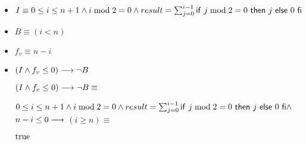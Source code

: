 \documentclass{article}
\begin{document}
\begin{itemize}
    \item $I \equiv 0 \leq i \leq n+1 \wedge i \bmod 2 = 0 \wedge result = \sum_{j=0}^{i-1} \mathsf{if}\ j \bmod 2 = 0\ \mathsf{then}\ j\ \mathsf{else}\ 0\ \mathsf{fi}$
    \item $B \equiv (i < n)$
    \item $f_{v} \equiv n-i$
\end{itemize}

\begin{itemize}
    \item $(I \wedge f_{v} \leq 0) \longrightarrow \neg B$

        $(I \wedge f_{v} \leq 0) \longrightarrow \neg B \equiv$

        $0 \leq i \leq n+1 \wedge i \bmod 2 = 0 \wedge result = \sum_{j=0}^{i-1} \mathsf{if}\ j \bmod 2 = 0\ \mathsf{then}\ j\ \mathsf{else}\ 0\ \mathsf{fi} \wedge$
        $n-i \leq 0 \longrightarrow$
        $(i \geq n) \equiv$

        $\mathrm{true}$

\end{itemize}
\end{document}

